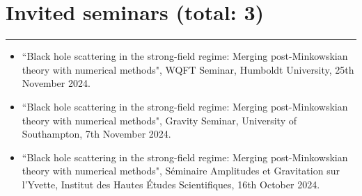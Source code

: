 \documentclass[10.5pt, oneside]{article}   	%
\begin{document}



 
  {\color{Sectioncolour}
\section*{Invited seminars {\rm (total: 3)}}
\vspace{-3mm}
\noindent\rule{\linewidth}{0.6pt}}
\begin{itemize}
\item ``Black hole scattering in the strong-field regime: Merging post-Minkowskian theory with numerical methods", WQFT Seminar, Humboldt University, 25th November 2024.
\item ``Black hole scattering in the strong-field regime: Merging post-Minkowskian theory with numerical methods", Gravity Seminar, University of Southampton, 7th November 2024.
\item ``Black hole scattering in the strong-field regime: Merging post-Minkowskian theory with numerical methods", Séminaire Amplitudes et Gravitation sur l'Yvette, Institut des Hautes Études Scientifiques, 16th October 2024.
\end{itemize} 
\end{document}
